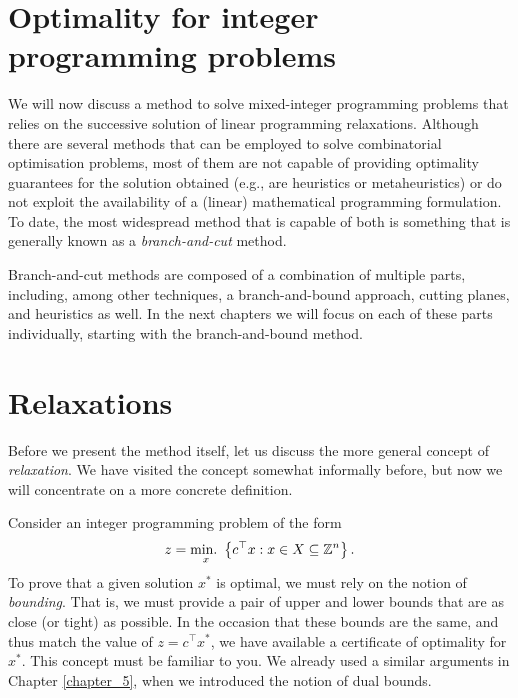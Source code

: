 
\section{Optimality for integer programming problems}

We will now discuss a method to solve mixed-integer programming problems that relies on the successive solution of linear programming relaxations. Although there are several methods that can be employed to solve combinatorial optimisation problems, most of them are not capable of providing optimality guarantees for the solution obtained (e.g., are heuristics or metaheuristics) or do not exploit the availability of a (linear) mathematical programming formulation. To date, the most widespread method that is capable of both is something that is generally known as a \emph{branch-and-cut} method.

Branch-and-cut methods are composed of a combination of multiple parts, including, among other techniques, a branch-and-bound approach, cutting planes, and heuristics as well. In the next chapters we will focus on each of these parts individually, starting with the branch-and-bound method.


\section{Relaxations}

Before we present the method itself, let us discuss the more general concept of \emph{relaxation}. We have visited the concept somewhat informally before, but now we will concentrate on a more concrete definition.

Consider an integer programming problem of the form
%
\begin{equation*}
	z = \mathop{\text{min.~}}_x \left\{ c^\top x : x \in X \subseteq \mathbb{Z}^n \right \}.
\end{equation*}
%
To prove that a given solution $x^*$ is optimal, we must rely on the notion of \emph{bounding}. That is, we must provide a pair of upper and lower bounds that are as close (or tight) as possible. In the occasion that these bounds are the same, and thus match the value of $z = c^\top x^*$, we have available a certificate of optimality for $x^*$. This concept must be familiar to you. We already used a similar arguments in Chapter \ref{chapter_5}, when we introduced the notion of dual bounds.


